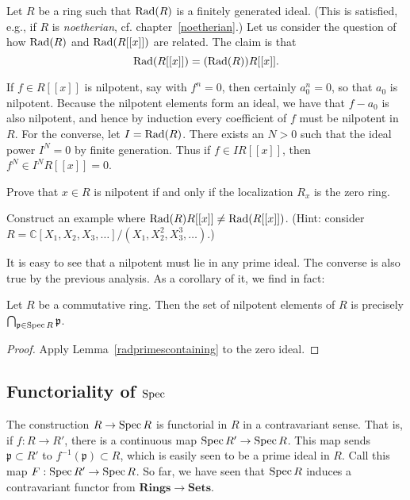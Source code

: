 \begin{example}
Let $R$ be  a ring such that $\operatorname{Rad}(R)$ is a finitely generated ideal. (This is
satisfied, e.g., if $R$ is \emph{noetherian}, cf. chapter~\ref{noetherian}.)
Let us consider the question of how $\operatorname{Rad}(R)$ and $\operatorname{Rad}(R[[x]])$ are related.
The claim is that
\[ \operatorname{Rad}(R[[x]]) = (\operatorname{Rad}(R))R[[x]].  \]

If $f\in R[[x]]$ is nilpotent, say with $f^n=0$, then
certainly $a_0^n=0$, so that $a_0$ is nilpotent. Because the nilpotent elements
form an ideal, we have that $f-a_0$ is also nilpotent, and hence by induction
every coefficient of $f$ must be nilpotent in $R$. 
For the converse, let $I =
\operatorname{Rad}(R)$. There
exists an $N>0$ such that the ideal power $I^N  = 0$ by finite generation. 
Thus if $f \in IR[[x]]$, then $f^N \in I^N R[[x]] = 0$.
\end{example} 
\begin{exercise} \label{nilpcriterion} 
Prove that $x \in R$ is nilpotent if and only if the localization $R_x$ is the
zero ring.
\end{exercise} 

\begin{exercise} 
Construct an example where $\operatorname{Rad}(R) R[[x]] \neq \operatorname{Rad}(R[[x]])$. (Hint: consider
$R = \mathbb{C}[X_1, X_2, X_3, \dots]/(X_1, X_2^2, X_3^3, \dots)$.)
\end{exercise} 


It is easy to see that a nilpotent must lie in  any prime ideal. The converse is
also true by the previous analysis.
As a corollary of it, we find in fact:
\begin{corollary} \label{nilradicalisprimes}
Let $R$ be a commutative ring. Then the set of nilpotent elements of $R$ is
precisely $\bigcap_{\mathfrak{p} \in \operatorname{Spec} R} \mathfrak{p}$.
\end{corollary} 
\begin{proof} 
Apply Lemma~\ref{radprimescontaining} to the zero ideal.
\end{proof} 


\subsection{Functoriality of $\operatorname{Spec}$}
 The construction $R \to \operatorname{Spec} R$ is functorial in $R$ in a
contravariant sense. That is, if $f: R \to R'$, there is a
continuous map $\operatorname{Spec}
R' \to \operatorname{Spec} R$. This map sends $\mathfrak{p} \subset R'$ to
$f^{-1}(\mathfrak{p}) \subset R$, which is easily seen to be a
prime ideal
in $R$. Call this map $F: \operatorname{Spec} R' \to \operatorname{Spec} R$. So far, we have
seen that
$\operatorname{Spec} R$ induces a contravariant functor from $\mathbf{Rings}
\to \mathbf{Sets}$.

